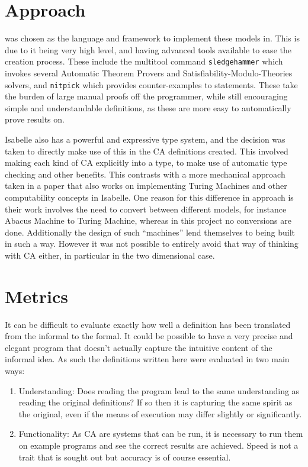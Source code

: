 \section{Approach}

 was chosen as the language and framework to implement these models in.
This is due to it being very high level,
and having advanced tools available to ease the creation process.
These include the multitool command \texttt{sledgehammer} which invokes several Automatic Theorem Provers and Satisfiability-Modulo-Theories solvers, and \texttt{nitpick} which provides counter-examples to statements.
These take the burden of large manual proofs off the programmer,
while still encouraging simple and understandable definitions,
as these are more easy to automatically prove results on.

Isabelle also has a powerful and expressive type system,
and the decision was taken to directly make use of this in the CA definitions created.
This involved making each kind of CA explicitly into a type,
to make use of automatic type checking and other benefits.
This contrasts with a more mechanical approach taken in a paper \cite{urban} that also works on implementing Turing Machines and other computability concepts in Isabelle.
One reason for this difference in approach is their work involves the need to convert between different models, for instance Abacus Machine to Turing Machine,
whereas in this project no conversions are done.
Additionally the design of such ``machines'' lend themselves to being built in such a way.
However it was not possible to entirely avoid that way of thinking with CA either, in particular in the two dimensional case.


\section{Metrics}

It can be difficult to evaluate exactly how well a definition has been translated from the informal to the formal.
It could be possible to have a very precise and elegant program that doesn't actually capture the intuitive content of the informal idea.
As such the definitions written here were evaluated in two main ways:

\begin{enumerate}
    \item Understanding: Does reading the program lead to the same understanding as reading the original definitions?
        If so then it is capturing the same spirit as the original,
        even if the means of execution may differ slightly or significantly.
    \item Functionality: As CA are systems that can be run,
        it is necessary to run them on example programs and see the correct results are achieved.
        Speed is not a trait that is sought out but accuracy is of course essential.
\end{enumerate}

